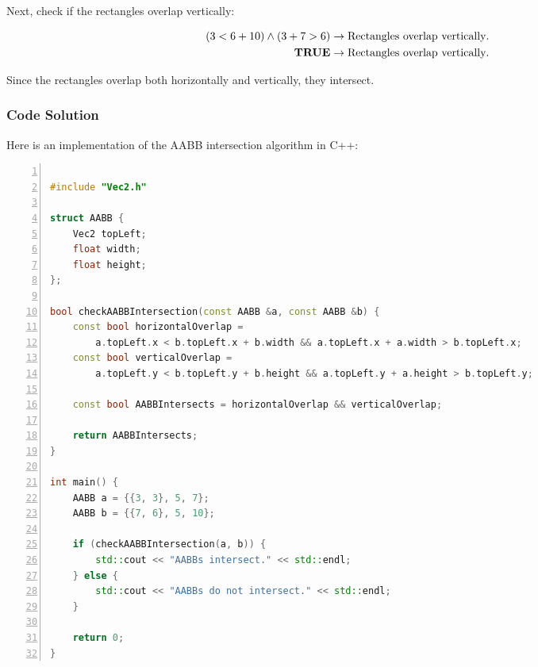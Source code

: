 Next, check if the rectangles overlap vertically:

\begin{equation*}
    \begin{aligned}
        (3 < 6 + 10) \land (3 + 7 > 6) & \rightarrow \text{Rectangles overlap vertically}. \\
        \textnormal{\textbf{TRUE}}     & \rightarrow \text{Rectangles overlap vertically}.
    \end{aligned}
\end{equation*}

Since the rectangles overlap both horizontally and vertically, they intersect.

\subsubsection{Code Solution}

Here is an implementation of the AABB intersection algorithm in C++:

\begin{mdframed}[linecolor=black!30!white,linewidth=.5pt,extratopheight=1em]
    \begin{lstlisting}[language=C++, aboveskip=3mm,
        belowskip=3mm,
        showstringspaces=false,
        columns=flexible,
        basicstyle={\small\ttfamily},
        numbers=left,
        numberstyle=\tiny\color{gray},
        keywordstyle=\color{blue},
        commentstyle=\color{dkgreen},
        stringstyle=\color{mauve},
        breaklines=true,
        breakatwhitespace=true,
        tabsize=3,
        xleftmargin=1em]

#include "Vec2.h"

struct AABB {
    Vec2 topLeft;
    float width;
    float height;
};

bool checkAABBIntersection(const AABB &a, const AABB &b) {
    const bool horizontalOverlap = 
        a.topLeft.x < b.topLeft.x + b.width && a.topLeft.x + a.width > b.topLeft.x;
    const bool verticalOverlap = 
        a.topLeft.y < b.topLeft.y + b.height && a.topLeft.y + a.height > b.topLeft.y;

    const bool AABBIntersects = horizontalOverlap && verticalOverlap;

    return AABBIntersects;
}

int main() {
    AABB a = {{3, 3}, 5, 7};
    AABB b = {{7, 6}, 5, 10};

    if (checkAABBIntersection(a, b)) {
        std::cout << "AABBs intersect." << std::endl;
    } else {
        std::cout << "AABBs do not intersect." << std::endl;
    }

    return 0;
}

\end{lstlisting}
\end{mdframed}

